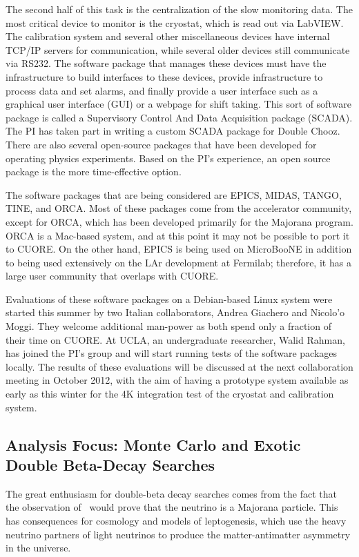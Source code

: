The second half of this task is the centralization of the slow monitoring data. The most critical device to monitor is the cryostat, which is read out via LabVIEW. The calibration system and several other miscellaneous devices have internal TCP/IP servers for communication, while several older devices still communicate via RS232. The software package that manages these devices must have the infrastructure to build interfaces to these devices, provide infrastructure to process data and set alarms, and finally provide a user interface such as a graphical user interface (GUI) or a webpage for shift taking. This sort of software package is called a Supervisory Control And Data Acquisition package (SCADA). The PI has taken part in writing a custom SCADA package for Double Chooz. There are also several open-source packages that have been developed for operating physics experiments. Based on the PI's experience, an open source package is the more time-effective option.

The software packages that are being considered are EPICS\cite{epics}, MIDAS\cite{midas}, TANGO\cite{tango}, TINE\cite{tine}, and ORCA\cite{orca}.  Most of these packages come from the accelerator community, except for ORCA, which has been developed primarily for the Majorana program. ORCA is a Mac-based system, and at this point it may not be possible to port it to CUORE. On the other hand, EPICS is being used on MicroBooNE in addition to being used extensively on the LAr development at Fermilab; therefore, it has a large user community that overlaps with CUORE.

Evaluations of these software packages on a Debian-based Linux system were started this summer by two Italian collaborators, Andrea Giachero and Nicolo'o Moggi. They welcome additional man-power as both spend only a fraction of their time on CUORE. At UCLA, an undergraduate researcher, Walid Rahman, has joined the PI's group and will start running tests of the software packages locally.  The results of these evaluations will be discussed at the next collaboration meeting in October 2012, with the aim of having a prototype system available as early as this winter for the 4K integration test of the cryostat and calibration system.

\subsection{Analysis Focus: Monte Carlo and Exotic Double Beta-Decay Searches}
The great enthusiasm for double-beta decay searches comes from the fact that the observation of \zeronu~would prove that the neutrino is a Majorana particle. This has consequences for cosmology and models of leptogenesis, which use the heavy neutrino partners of light neutrinos to produce the matter-antimatter asymmetry in the universe. 

